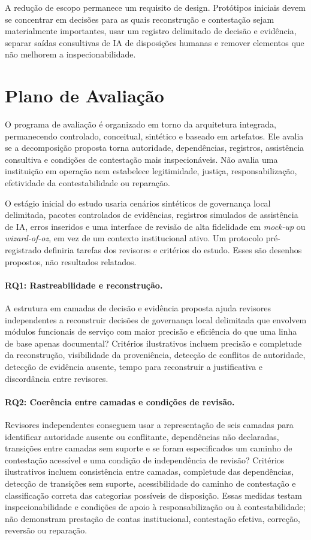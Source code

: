 \documentclass[11pt]{article}
\begin{document}
A redução de escopo permanece um requisito de design. Protótipos iniciais
devem se concentrar em decisões para as quais reconstrução e contestação sejam
materialmente importantes, usar um registro delimitado de decisão e evidência,
separar saídas consultivas de IA de disposições humanas e remover elementos
que não melhorem a inspecionabilidade.

\section{Plano de Avaliação}

O programa de avaliação é organizado em torno da arquitetura integrada,
permanecendo controlado, conceitual, sintético e baseado em artefatos. Ele
avalia se a decomposição proposta torna autoridade, dependências, registros,
assistência consultiva e condições de contestação mais inspecionáveis. Não
avalia uma instituição em operação nem estabelece legitimidade, justiça,
responsabilização, efetividade da contestabilidade ou reparação.

O estágio inicial do estudo usaria cenários sintéticos de governança local
delimitada, pacotes controlados de evidências, registros simulados de
assistência de IA, erros inseridos e uma interface de revisão de alta
fidelidade em \emph{mock-up} ou \emph{wizard-of-oz}, em vez de um contexto
institucional ativo. Um protocolo pré-registrado definiria tarefas dos
revisores e critérios do estudo. Esses são desenhos propostos, não resultados
relatados.

\paragraph{RQ1: Rastreabilidade e reconstrução.} A estrutura em camadas de
decisão e evidência proposta ajuda revisores independentes a reconstruir
decisões de governança local delimitada que envolvem módulos funcionais de
serviço com maior precisão e eficiência do que uma linha de base apenas
documental? Critérios ilustrativos incluem precisão e completude da
reconstrução, visibilidade da proveniência, detecção de conflitos de
autoridade, detecção de evidência ausente, tempo para reconstruir a
justificativa e discordância entre revisores.

\paragraph{RQ2: Coerência entre camadas e condições de revisão.} Revisores
independentes conseguem usar a representação de seis camadas para identificar
autoridade ausente ou conflitante, dependências não declaradas, transições
entre camadas sem suporte e se foram especificados um caminho de contestação
acessível e uma condição de independência de revisão? Critérios ilustrativos
incluem consistência entre camadas, completude das dependências, detecção de
transições sem suporte, acessibilidade do caminho de contestação e
classificação correta das categorias possíveis de disposição. Essas medidas
testam inspecionabilidade e condições de apoio à responsabilização ou à
contestabilidade; não demonstram prestação de contas institucional,
contestação efetiva, correção, reversão ou reparação.
\end{document}
